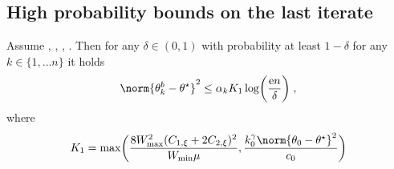 \subsection{High probability bounds on the last iterate}

\begin{lemma}
\label{lem: high_prob_last_iter_boot}
Assume , , ,  . Then for any $\delta \in (0,1)$ with probability at least $1-\delta$ for any $k\in\{1,\ldots n\}$ it holds 
\begin{equation}
    \norm{\theta_k^b - \thetas}^2 \leq \alpha_k K_1\log\biggl(\frac{\rme n}{\delta}\biggr)\eqsp,
\end{equation}
where 
\begin{equation}
    \label{eq:def_K_1}
    K_1 = \max\biggl(\frac{8W_{\max}^2(C_{1,\xi}+2C_{2,\xi})^2}{W_{\min}\mu},\frac{k_0^\gamma\norm{\theta_0-\thetas}^2}{c_0} \biggr)
\end{equation}
\end{lemma}
